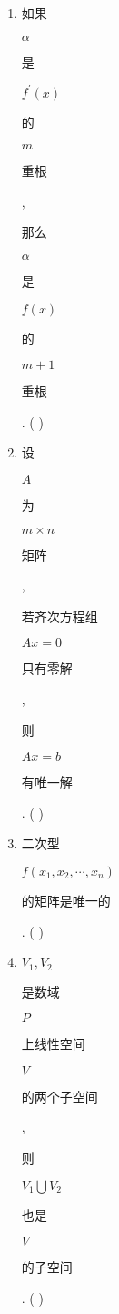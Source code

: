 \documentclass[10pt]{article}
\begin{document}
\begin{enumerate}
  \item \begin{CJK}{UTF8}{mj}如果\end{CJK} $\alpha$ \begin{CJK}{UTF8}{mj}是\end{CJK} $f^{\prime}(x)$ \begin{CJK}{UTF8}{mj}的\end{CJK} $m$ \begin{CJK}{UTF8}{mj}重根\end{CJK}, \begin{CJK}{UTF8}{mj}那么\end{CJK} $\alpha$ \begin{CJK}{UTF8}{mj}是\end{CJK} $f(x)$ \begin{CJK}{UTF8}{mj}的\end{CJK} $m+1$ \begin{CJK}{UTF8}{mj}重根\end{CJK}. ( )

  \item \begin{CJK}{UTF8}{mj}设\end{CJK} $A$ \begin{CJK}{UTF8}{mj}为\end{CJK} $m \times n$ \begin{CJK}{UTF8}{mj}矩阵\end{CJK}, \begin{CJK}{UTF8}{mj}若齐次方程组\end{CJK} $A x=0$ \begin{CJK}{UTF8}{mj}只有零解\end{CJK}, \begin{CJK}{UTF8}{mj}则\end{CJK} $A x=b$ \begin{CJK}{UTF8}{mj}有唯一解\end{CJK}. ( )

  \item \begin{CJK}{UTF8}{mj}二次型\end{CJK} $f\left(x_{1}, x_{2}, \cdots, x_{n}\right)$ \begin{CJK}{UTF8}{mj}的矩阵是唯一的\end{CJK}. ( )

  \item $V_{1}, V_{2}$ \begin{CJK}{UTF8}{mj}是数域\end{CJK} $P$ \begin{CJK}{UTF8}{mj}上线性空间\end{CJK} $V$ \begin{CJK}{UTF8}{mj}的两个子空间\end{CJK}, \begin{CJK}{UTF8}{mj}则\end{CJK} $V_{1} \bigcup V_{2}$ \begin{CJK}{UTF8}{mj}也是\end{CJK} $V$ \begin{CJK}{UTF8}{mj}的子空间\end{CJK}. ( )


\end{enumerate}
\end{document}
